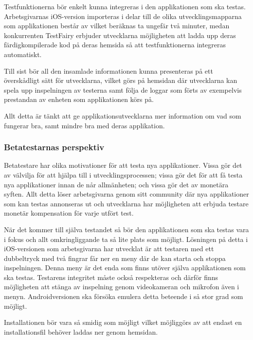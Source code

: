 Testfunktionerna bör enkelt kunna integreras i den applikationen som ska testas. Arbetsgivarnas iOS-version importeras i delar till de olika utvecklingsmapparna som applikationen består av vilket beräknas ta ungefär två minuter, medan konkurrenten TestFairy erbjuder utvecklarna möjligheten att ladda upp deras färdigkompilerade kod på deras hemsida så att testfunktionerna integreras automatiskt. 

Till sist bör all den insamlade informationen kunna presenteras på ett överskådligt sätt för utvecklarna, vilket görs på hemsidan där utvecklarna kan spela upp inspelningen av testerna samt följa de loggar som förts av exempelvis prestandan av enheten som applikationen körs på. 

Allt detta är tänkt att ge applikationsutvecklarna mer information om vad som fungerar bra, samt mindre bra med deras applikation. 

\subsubsection{Betatestarnas perspektiv}
Betatestare har olika motivationer för att testa nya applikationer. Vissa gör det av välvilja för att hjälpa till i utvecklingsprocessen; vissa gör det för att få testa nya applikationer innan de når allmänheten; och vissa gör det av monetära syften. Allt detta löser arbetsgivarna genom sitt community där nya applikationer som kan testas annonseras ut och utvecklarna har möjligheten att erbjuda testare monetär kompensation för varje utfört test. 

När det kommer till själva testandet så bör den applikationen som ska testas vara i fokus och allt omkringliggande ta så lite plats som möjligt. Lösningen på detta i iOS-versionen som arbetsgivarna har utvecklat är att testaren med ett dubbeltryck med två fingrar får ner en meny där de kan starta och stoppa inspelningen. Denna meny är det enda som finns utöver själva applikationen som ska testas. Testarens integritet måste också respekteras och därför finns möjligheten att stänga av inspelning genom videokameran och mikrofon även i menyn. Androidversionen ska försöka emulera detta beteende i så stor grad som möjligt. 

Installationen bör vara så smidig som möjligt vilket möjliggörs av att endast en installationsfil behöver laddas ner genom hemsidan. 